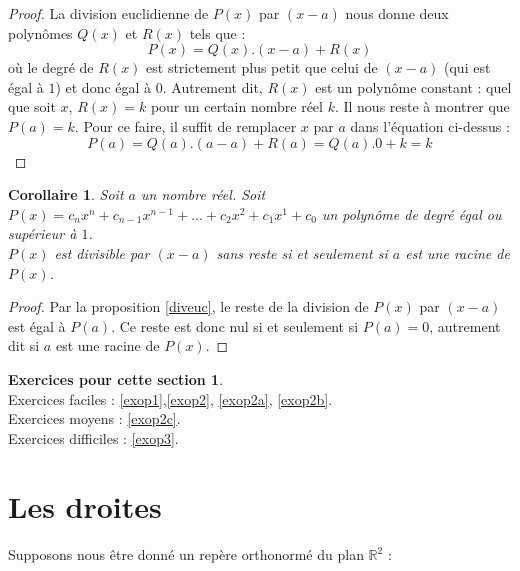 \documentclass[a4paper,13pt]{scrreprt}
\theoremstyle{plain}
\newtheorem{cor}[subsection]{Corollaire}
\theoremstyle{definition}
\newtheorem*{epcs}{Exercices pour cette section}
\newcommand{\rr}{\mathbb{R}}
\begin{document}
\begin{proof} \label{diveuc}
	La division euclidienne de $P(x)$ par $(x-a)$ nous donne deux polynômes $Q(x)$ et $R(x)$ tels que :
	$$P(x) = Q(x).(x-a)+R(x)$$
	où le degré de $R(x)$ est strictement plus petit que celui de $(x-a)$ (qui est égal à $1$) et donc égal à $0$. Autrement dit, $R(x)$ est un polynôme constant : quel que soit $x$, $R(x)=k$ pour un certain nombre réel $k$. Il nous reste à montrer que $P(a)=k$. Pour ce faire, il suffit de remplacer $x$ par $a$ dans l'équation ci-dessus :
	$$P(a) = Q(a).(a-a)+R(a)= Q(a).0 + k = k$$
\end{proof}
\begin{cor}
	Soit $a$ un nombre réel. Soit $P(x)=c_n x^n + c_{n-1} x^{n-1} + ... + c_2 x^2 + c_1 x^1 + c_0$ un polynôme de degré égal ou supérieur à $1$. \\
	$P(x)$ est divisible par $(x-a)$ sans reste si et seulement si $a$ est une racine de $P(x)$.
\end{cor}
\begin{proof}
	Par la proposition \ref{diveuc}, le reste de la division de $P(x)$ par $(x-a)$ est égal à $P(a)$. Ce reste est donc nul si et seulement si $P(a)=0$, autrement dit si $a$ est une racine de $P(x)$.
\end{proof}
\begin{epcs}
	~~\\
	Exercices faciles : \ref{exop1},\ref{exop2}, \ref{exop2a}, \ref{exop2b}.\\
	Exercices moyens :  \ref{exop2c}.\\
	Exercices difficiles : \ref{exop3}.
\end{epcs}

\section{Les droites}

Supposons nous être donné un repère orthonormé du plan ${\rr}^2$ :
\begin{center}
\end{center}
\end{document}
